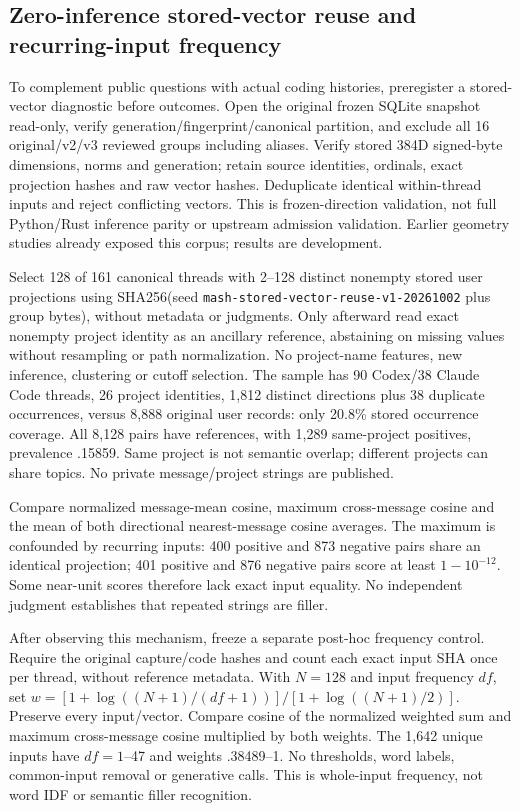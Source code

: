 \documentclass[11pt]{article}
\begin{document}
\subsection{Zero-inference stored-vector reuse and recurring-input frequency}
To complement public questions with actual coding histories, preregister a
stored-vector diagnostic before outcomes. Open the original frozen SQLite
snapshot read-only, verify generation/fingerprint/canonical partition, and
exclude all 16 original/v2/v3 reviewed groups including aliases. Verify stored
384D signed-byte dimensions, norms and generation; retain source identities,
ordinals, exact projection hashes and raw vector hashes. Deduplicate identical
within-thread inputs and reject conflicting vectors. This is frozen-direction
validation, not full Python/Rust inference parity or upstream admission validation.
Earlier geometry studies already exposed this corpus; results are development.

Select 128 of 161 canonical threads with 2--128 distinct nonempty stored user
projections using SHA256(seed \texttt{mash-stored-vector-reuse-v1-20261002} plus
group bytes), without metadata or judgments. Only afterward read exact nonempty
project identity as an ancillary reference, abstaining on missing values without
resampling or path normalization. No project-name features, new inference,
clustering or cutoff selection. The sample has 90 Codex/38 Claude Code threads,
26 project identities, 1,812 distinct directions plus 38 duplicate occurrences,
versus 8,888 original user records: only 20.8\% stored occurrence coverage.
All 8,128 pairs have references, with 1,289 same-project positives, prevalence
.15859. Same project is not semantic overlap; different projects can share topics.
No private message/project strings are published.

Compare normalized message-mean cosine, maximum cross-message cosine and the
mean of both directional nearest-message cosine averages. The maximum is
confounded by recurring inputs: 400 positive and 873 negative pairs share an
identical projection; 401 positive and 876 negative pairs score at least
$1-10^{-12}$. Some near-unit scores therefore lack exact input equality.
No independent judgment establishes that repeated strings are filler.

After observing this mechanism, freeze a separate post-hoc frequency control.
Require the original capture/code hashes and count each exact input SHA once
per thread, without reference metadata. With $N=128$ and input frequency $df$,
set $w=[1+\log((N+1)/(df+1))]/[1+\log((N+1)/2)]$. Preserve every input/vector.
Compare cosine of the normalized weighted sum and maximum cross-message cosine
multiplied by both weights. The 1,642 unique inputs have $df=1$--47 and weights
.38489--1. No thresholds, word labels, common-input removal or generative calls.
This is whole-input frequency, not word IDF or semantic filler recognition.
\end{document}
